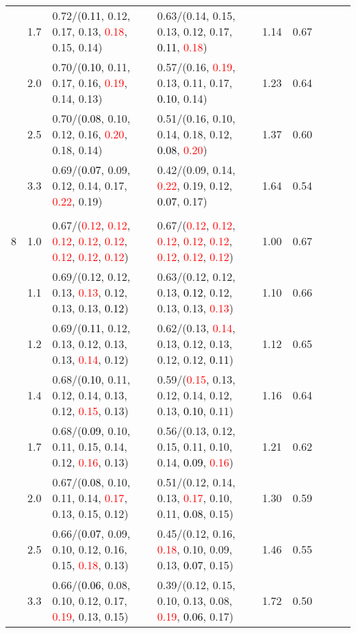 \documentclass[10pt,a4paper]{report}
\begin{document}
\begin{table}[!htbp]
\begin{center}
{\begin{tabular}{ccllccccc}
			&1.7&0.72/(\textcolor{black}{0.11}, 0.12, 0.17, 0.13, \textcolor{red}{0.18}, 0.15, 0.14)&0.63/(0.14, 0.15, 0.13, 0.12, 0.17, \textcolor{black}{0.11}, \textcolor{red}{0.18})&1.14&0.67\\
			&2.0&0.70/(\textcolor{black}{0.10}, 0.11, 0.17, 0.16, \textcolor{red}{0.19}, 0.14, 0.13)&0.57/(0.16, \textcolor{red}{0.19}, 0.13, 0.11, 0.17, \textcolor{black}{0.10}, 0.14)&1.23&0.64\\
			&2.5&0.70/(\textcolor{black}{0.08}, 0.10, 0.12, 0.16, \textcolor{red}{0.20}, 0.18, 0.14)&0.51/(0.16, 0.10, 0.14, 0.18, 0.12, \textcolor{black}{0.08}, \textcolor{red}{0.20})&1.37&0.60\\
			&3.3&0.69/(\textcolor{black}{0.07}, 0.09, 0.12, 0.14, 0.17, \textcolor{red}{0.22}, 0.19)&0.42/(0.09, 0.14, \textcolor{red}{0.22}, 0.19, 0.12, \textcolor{black}{0.07}, 0.17)&1.64&0.54\\
			&&&&\\
			8			&1.0&0.67/(\textcolor{red}{0.12}, \textcolor{red}{0.12}, \textcolor{red}{0.12}, \textcolor{red}{0.12}, \textcolor{red}{0.12}, \textcolor{red}{0.12}, \textcolor{red}{0.12}, \textcolor{red}{0.12})&0.67/(\textcolor{red}{0.12}, \textcolor{red}{0.12}, \textcolor{red}{0.12}, \textcolor{red}{0.12}, \textcolor{red}{0.12}, \textcolor{red}{0.12}, \textcolor{red}{0.12}, \textcolor{red}{0.12})&1.00&0.67\\
			&1.1&0.69/(0.12, 0.12, 0.13, \textcolor{red}{0.13}, 0.12, 0.13, 0.13, \textcolor{black}{0.12})&0.63/(0.12, 0.12, 0.13, \textcolor{black}{0.12}, 0.12, 0.13, 0.13, \textcolor{red}{0.13})&1.10&0.66\\
			&1.2&0.69/(\textcolor{black}{0.11}, 0.12, 0.13, 0.12, 0.13, 0.13, \textcolor{red}{0.14}, 0.12)&0.62/(0.13, \textcolor{red}{0.14}, 0.13, 0.12, 0.13, 0.12, 0.12, \textcolor{black}{0.11})&1.12&0.65\\
			&1.4&0.68/(\textcolor{black}{0.10}, 0.11, 0.12, 0.14, 0.13, 0.12, \textcolor{red}{0.15}, 0.13)&0.59/(\textcolor{red}{0.15}, 0.13, 0.12, 0.14, 0.12, 0.13, \textcolor{black}{0.10}, 0.11)&1.16&0.64\\
			&1.7&0.68/(\textcolor{black}{0.09}, 0.10, 0.11, 0.15, 0.14, 0.12, \textcolor{red}{0.16}, 0.13)&0.56/(0.13, 0.12, 0.15, 0.11, 0.10, 0.14, \textcolor{black}{0.09}, \textcolor{red}{0.16})&1.21&0.62\\
			&2.0&0.67/(\textcolor{black}{0.08}, 0.10, 0.11, 0.14, \textcolor{red}{0.17}, 0.13, 0.15, 0.12)&0.51/(0.12, 0.14, 0.13, \textcolor{red}{0.17}, 0.10, 0.11, \textcolor{black}{0.08}, 0.15)&1.30&0.59\\
			&2.5&0.66/(\textcolor{black}{0.07}, 0.09, 0.10, 0.12, 0.16, 0.15, \textcolor{red}{0.18}, 0.13)&0.45/(0.12, 0.16, \textcolor{red}{0.18}, 0.10, 0.09, 0.13, \textcolor{black}{0.07}, 0.15)&1.46&0.55\\
			&3.3&0.66/(\textcolor{black}{0.06}, 0.08, 0.10, 0.12, 0.17, \textcolor{red}{0.19}, 0.13, 0.15)&0.39/(0.12, 0.15, 0.10, 0.13, 0.08, \textcolor{red}{0.19}, \textcolor{black}{0.06}, 0.17)&1.72&0.50\\
			\bottomrule
		\end{tabular}}
	\end{center}
\end{table}
\end{document}
